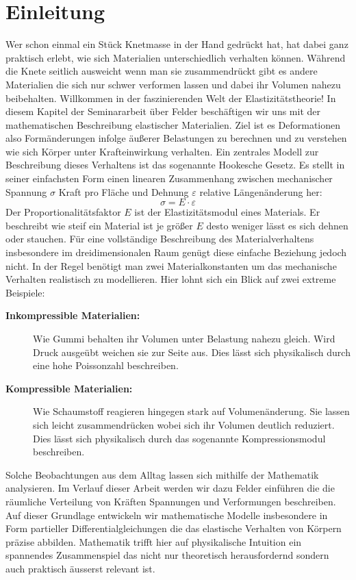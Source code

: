 %
%
%
%
\section{Einleitung}
\label{elastomechanik:section:Einleitung}
Wer schon einmal ein Stück Knetmasse in der Hand gedrückt hat, hat dabei ganz praktisch erlebt, wie sich Materialien unterschiedlich verhalten können. 
Während die Knete seitlich ausweicht wenn man sie zusammendrückt gibt es andere Materialien die sich nur schwer verformen lassen und dabei ihr Volumen nahezu beibehalten. 
Willkommen in der faszinierenden Welt der Elastizitätstheorie!
In diesem Kapitel der Seminararbeit über Felder beschäftigen wir uns mit der mathematischen Beschreibung elastischer Materialien.
Ziel ist es Deformationen also Formänderungen infolge äußerer Belastungen zu berechnen und zu verstehen wie sich Körper unter Krafteinwirkung verhalten.
Ein zentrales Modell zur Beschreibung dieses Verhaltens ist das sogenannte Hookesche Gesetz.
Es stellt in seiner einfachsten Form einen linearen Zusammenhang zwischen mechanischer Spannung $\sigma$ Kraft pro Fläche und Dehnung $\varepsilon$ relative Längenänderung her:
\begin{equation}
\sigma = E \cdot \varepsilon
\end{equation}
Der Proportionalitätsfaktor $E$ ist der Elastizitätsmodul eines Materials.
Er beschreibt wie steif ein Material ist je größer $E$ desto weniger lässt es sich dehnen oder stauchen.
Für eine vollständige Beschreibung des Materialverhaltens insbesondere im dreidimensionalen Raum genügt diese einfache Beziehung jedoch nicht.
In der Regel benötigt man zwei Materialkonstanten um das mechanische Verhalten realistisch zu modellieren.
Hier lohnt sich ein Blick auf zwei extreme Beispiele:
\begin{description}
\item[\textbf{Inkompressible Materialien:}] Wie Gummi behalten ihr Volumen unter Belastung nahezu gleich.
Wird Druck ausgeübt weichen sie zur Seite aus.
Dies lässt sich physikalisch durch eine hohe Poissonzahl beschreiben.
\item[\textbf{Kompressible Materialien:}]  Wie Schaumstoff reagieren hingegen stark auf Volumenänderung.
Sie lassen sich leicht zusammendrücken wobei sich ihr Volumen deutlich reduziert.
Dies lässt sich physikalisch durch das sogenannte Kompressionsmodul beschreiben.
\end{description}

Solche Beobachtungen aus dem Alltag lassen sich mithilfe der Mathematik analysieren.
Im Verlauf dieser Arbeit werden wir dazu Felder einführen die die räumliche Verteilung von Kräften Spannungen und Verformungen beschreiben.
Auf dieser Grundlage entwickeln wir mathematische Modelle insbesondere in Form partieller Differentialgleichungen die das elastische Verhalten von Körpern präzise abbilden.
Mathematik trifft hier auf physikalische Intuition ein spannendes Zusammenspiel das nicht nur theoretisch herausfordernd sondern auch praktisch äusserst relevant ist.
